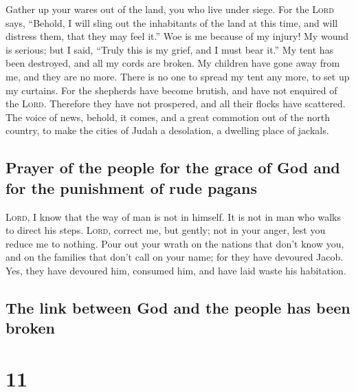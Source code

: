  Gather up your wares out of the land, you who live under
siege.  For the \textsc{Lord} says, ``Behold, I will
sling out the inhabitants of the land at this time, and will distress
them, that they may feel it.''  Woe is me because of my
injury! My wound is serious; but I said, ``Truly this is my grief, and I
must bear it.''  My tent has been destroyed, and all my
cords are broken. My children have gone away from me, and they are no
more. There is no one to spread my tent any more, to set up my curtains.
 For the shepherds have become brutish, and have not
enquired of the \textsc{Lord}. Therefore they have not prospered, and
all their flocks have scattered.  The voice of news,
behold, it comes, and a great commotion out of the north country, to
make the cities of Judah a desolation, a dwelling place of jackals.

\hypertarget{prayer-of-the-people-for-the-grace-of-god-and-for-the-punishment-of-rude-pagans}{%
\subsection{Prayer of the people for the grace of God and for the
punishment of rude
pagans}\label{prayer-of-the-people-for-the-grace-of-god-and-for-the-punishment-of-rude-pagans}}

 \textsc{Lord}, I know that the way of man is not in
himself. It is not in man who walks to direct his steps. 
\textsc{Lord}, correct me, but gently; not in your anger, lest you
reduce me to nothing.  Pour out your wrath on the nations
that don't know you, and on the families that don't call on your name;
for they have devoured Jacob. Yes, they have devoured him, consumed him,
and have laid waste his habitation.

\hypertarget{the-link-between-god-and-the-people-has-been-broken}{%
\subsection{The link between God and the people has been
broken}\label{the-link-between-god-and-the-people-has-been-broken}}

\hypertarget{section-10}{%
\section{11}\label{section-10}}

